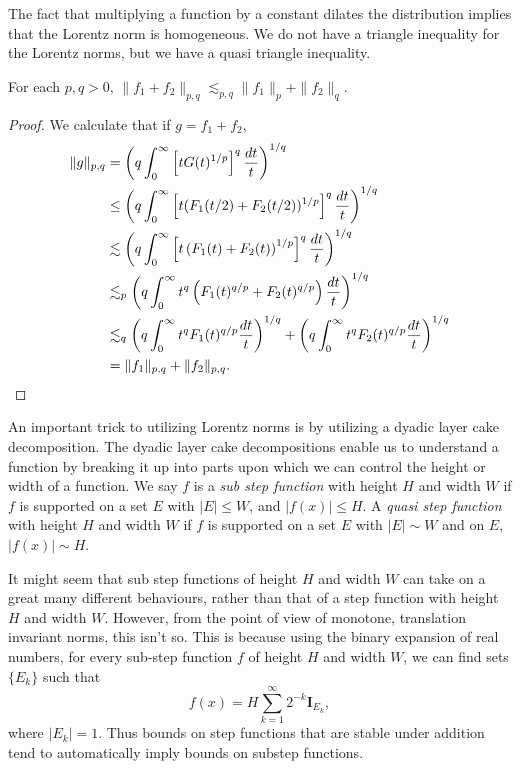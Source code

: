 The fact that multiplying a function by a constant dilates the distribution implies that the Lorentz norm is homogeneous. We do not have a triangle inequality for the Lorentz norms, but we have a quasi triangle inequality.

\begin{theorem}
	For each $p,q > 0$, $\| f_1 + f_2 \|_{p,q} \lesssim_{p,q} \| f_1 \|_p + \| f_2 \|_q$.
\end{theorem}
\begin{proof}
    We calculate that if $g = f_1 + f_2$,
    \begin{align*}
    \| g \|_{p,q} &= \left( q \int_0^\infty \left[t G(t)^{1/p} \right]^q \frac{dt}{t} \right)^{1/q}\\
    &\leq \left( q \int_0^\infty \left[ t (F_1(t/2) + F_2(t/2))^{1/p} \right]^q \frac{dt}{t} \right)^{1/q}\\
    &\lesssim \left( q \int_0^\infty \left[ t \left( F_1(t) + F_2(t) \right)^{1/p} \right]^q \frac{dt}{t} \right)^{1/q}\\
    &\lesssim_p \left( q \int_0^\infty t^q \left( F_1(t)^{q/p} + F_2(t)^{q/p} \right) \frac{dt}{t} \right)^{1/q}\\
    &\lesssim_q  \left( q \int_0^\infty t^q F_1(t)^{q/p} \frac{dt}{t} \right)^{1/q} +  \left( q \int_0^\infty t^q F_2(t)^{q/p} \frac{dt}{t} \right)^{1/q}\\
    &= \| f_1 \|_{p,q} + \| f_2 \|_{p,q}. \qedhere
  \end{align*}
\end{proof}

An important trick to utilizing Lorentz norms is by utilizing a dyadic layer cake decomposition. The dyadic layer cake decompositions enable us to understand a function by breaking it up into parts upon which we can control the height or width of a function. We say $f$ is a \emph{sub step function} with height $H$ and width $W$ if $f$ is supported on a set $E$ with $|E| \leq W$, and $|f(x)| \leq H$. A \emph{quasi step function} with height $H$ and width $W$ if $f$ is supported on a set $E$ with $|E| \sim W$ and on $E$, $|f(x)| \sim H$.

\begin{remark}
  It might seem that sub step functions of height $H$ and width $W$ can take on a great many different behaviours, rather than that of a step function with height $H$ and width $W$. However, from the point of view of monotone, translation invariant norms, this isn't so. This is because using the binary expansion of real numbers, for every sub-step function $f$ of height $H$ and width $W$, we can find sets $\{ E_k \}$ such that
  \[ f(x) = H \sum_{k = 1}^\infty 2^{-k} \mathbf{I}_{E_k}, \]
  where $|E_k| = 1$. Thus bounds on step functions that are stable under addition tend to automatically imply bounds on substep functions.
\end{remark}

